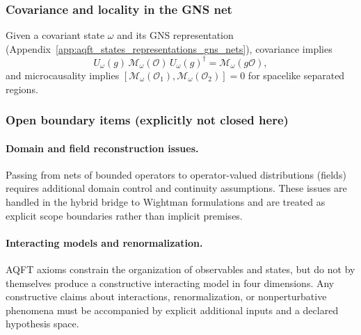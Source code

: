 \subsubsection{Covariance and locality in the GNS net}
Given a covariant state $\omega$ and its GNS representation (Appendix~\ref{app:aqft_states_representations_gns_nets}), covariance implies
\[
U_\omega(g)\,\mathcal{M}_\omega(\mathcal{O})\,U_\omega(g)^\dagger=\mathcal{M}_\omega(g\mathcal{O}),
\]
and microcausality implies $[\mathcal{M}_\omega(\mathcal{O}_1),\mathcal{M}_\omega(\mathcal{O}_2)]=0$ for spacelike separated regions.

\subsubsection{Open boundary items (explicitly not closed here)}
\paragraph{Domain and field reconstruction issues.}
\AuditTag Passing from nets of bounded operators to operator-valued distributions (fields) requires additional domain control and continuity assumptions.
These issues are handled in the hybrid bridge to Wightman formulations and are treated as explicit scope boundaries rather than implicit premises.

\paragraph{Interacting models and renormalization.}
\AuditTag AQFT axioms constrain the organization of observables and states, but do not by themselves produce a constructive interacting model in four dimensions.
Any constructive claims about interactions, renormalization, or nonperturbative phenomena must be accompanied by explicit additional inputs and a declared hypothesis space.
